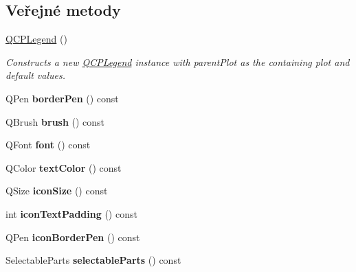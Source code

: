 \subsection*{Veřejné metody}
\begin{DoxyCompactItemize}
\item 
\hyperlink{classQCPLegend_a0001a456989bd07ea378883651fabd72}{Q\+C\+P\+Legend} ()
\begin{DoxyCompactList}\small\item\em Constructs a new \hyperlink{classQCPLegend}{Q\+C\+P\+Legend} instance with {\itshape parent\+Plot} as the containing plot and default values. \end{DoxyCompactList}\item 
\hypertarget{classQCPLegend_a8ffd92df86ddf43696d95f04a20e3226}{}Q\+Pen {\bfseries border\+Pen} () const \label{classQCPLegend_a8ffd92df86ddf43696d95f04a20e3226}

\item 
\hypertarget{classQCPLegend_a7e5d2766e7d724f399022be8a4e8a2cb}{}Q\+Brush {\bfseries brush} () const \label{classQCPLegend_a7e5d2766e7d724f399022be8a4e8a2cb}

\item 
\hypertarget{classQCPLegend_a5cf8b840bc02f7bf4edb8dde400d0f41}{}Q\+Font {\bfseries font} () const \label{classQCPLegend_a5cf8b840bc02f7bf4edb8dde400d0f41}

\item 
\hypertarget{classQCPLegend_ad60a058af7491f6b140c104c6a0f9458}{}Q\+Color {\bfseries text\+Color} () const \label{classQCPLegend_ad60a058af7491f6b140c104c6a0f9458}

\item 
\hypertarget{classQCPLegend_a27dfb770b14adc0e8811bef8129780a5}{}Q\+Size {\bfseries icon\+Size} () const \label{classQCPLegend_a27dfb770b14adc0e8811bef8129780a5}

\item 
\hypertarget{classQCPLegend_a9d6d07042a284c4ba5f9e3cb5c9281ef}{}int {\bfseries icon\+Text\+Padding} () const \label{classQCPLegend_a9d6d07042a284c4ba5f9e3cb5c9281ef}

\item 
\hypertarget{classQCPLegend_a2c4719d79630b0d0c75ef2333c59a912}{}Q\+Pen {\bfseries icon\+Border\+Pen} () const \label{classQCPLegend_a2c4719d79630b0d0c75ef2333c59a912}

\item 
\hypertarget{classQCPLegend_aa90c7fdbad7a0e93527bafb1f1f49a43}{}Selectable\+Parts {\bfseries selectable\+Parts} () const \label{classQCPLegend_aa90c7fdbad7a0e93527bafb1f1f49a43}


\end{DoxyCompactItemize}
